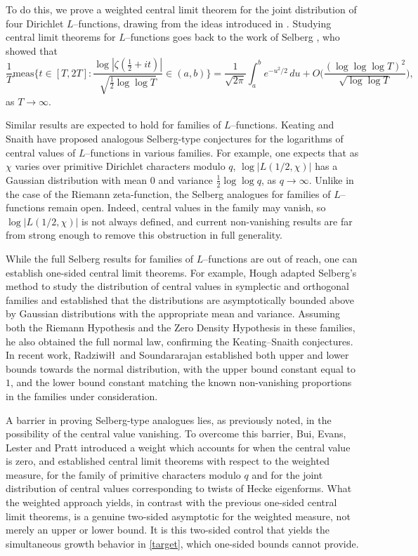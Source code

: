 \documentclass[12pt, reqno]{amsart}
\numberwithin{equation}{section}
\numberwithin{theorem}{section}
\numberwithin{equation}{section}
\begin{document}
To do this, we prove a weighted central limit theorem for the joint distribution of four Dirichlet $L$--functions, drawing from the ideas introduced in \cite{BELP}. Studying central limit theorems for $L$--functions goes back to the work of Selberg \cite{selberg}, who showed that 
$$ \frac{1}{T} \text{meas} \bigg\{ t \in [T, 2T]: \frac{ \log |\zeta(\frac12+it)|}{\sqrt{\frac{1}{2} \log \log T}} \in (a,b) \bigg\}= \frac{1}{\sqrt{2 \pi } }\int_a^b e^{-u^2/2} \, du + O \Big(  \frac{ (\log \log \log  T)^2}{\sqrt{\log \log T}}\Big),$$ as $T \to \infty$. 

Similar results are expected to hold for families of $L$--functions. Keating and Snaith \cite{KS} have proposed analogous Selberg-type conjectures for the logarithms of central values of $L$--functions in various families. For example, one expects that as $\chi$ varies over primitive Dirichlet characters modulo $q$, $\log |L(1/2,\chi)|$ has a Gaussian distribution with mean $0$ and variance $\frac{1}{2} \log \log q$, as $q \to \infty$. Unlike in the case of the Riemann zeta-function, the Selberg analogues for families of $L$--functions remain open. Indeed, 
central values in the family may vanish, so $\log |L(1/2,\chi)|$ is not always defined, and current non-vanishing results are far from strong enough to remove this obstruction in full generality.

While the full Selberg results for families of $L$--functions are out of reach, one can establish one-sided central limit theorems. For example, Hough \cite{hough} adapted Selberg's method to study the distribution of central values in symplectic and orthogonal families and established that the distributions are asymptotically bounded above by Gaussian distributions with the appropriate mean and variance. Assuming both the Riemann Hypothesis and the Zero Density Hypothesis in these families, he also obtained the full normal law, confirming  the Keating--Snaith conjectures. In recent work, Radziwi\l\l\ and Soundararajan \cite{RS1, RS2} established both upper and lower bounds towards the normal distribution, with the upper bound constant equal to $1$, and the lower bound constant matching the known non-vanishing proportions in the families under consideration. 

A barrier in proving Selberg-type analogues lies, as previously noted, in the possibility of the central value vanishing. To overcome this barrier, Bui, Evans, Lester and Pratt \cite{BELP} introduced a weight which accounts for when the central value is zero, and established central limit theorems with respect to the weighted measure, for the family of primitive characters modulo $q$ and for the joint distribution of central values corresponding to twists of Hecke eigenforms. What the weighted approach yields, in contrast with the previous one-sided central limit theorems, is a genuine two-sided asymptotic for
the weighted measure, not merely an upper or lower bound. It is this two-sided
control that yields the simultaneous growth behavior in \eqref{target},
which one-sided bounds cannot provide.
\end{document}
